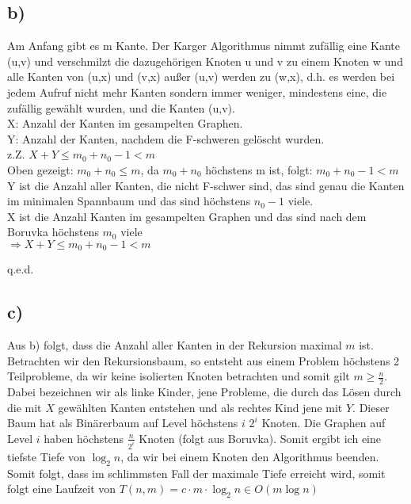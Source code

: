 \documentclass[a4paper,11pt,twoside]{scrartcl}
\newcommand{\qed}{%
	\begin{flushright}
		q.e.d.
	\end{flushright}%
	}
\begin{document}
\subsection*{b)}
Am Anfang gibt es m Kante. Der Karger Algorithmus nimmt zufällig eine Kante (u,v) und verschmilzt die dazugehörigen Knoten u und v zu einem Knoten w und alle Kanten von (u,x) und (v,x) außer (u,v) werden zu (w,x), d.h. es werden bei jedem Aufruf nicht mehr Kanten sondern immer weniger, mindestens eine, die zufällig gewählt wurden, und die Kanten (u,v). \\
X: Anzahl der Kanten im gesampelten Graphen.\\
Y: Anzahl der Kanten, nachdem die F-schweren gelöscht wurden. \\
z.Z. $X+Y \leq m_0+n_0-1 < m$\\
Oben gezeigt: $m_0+n_0 \leq m$, da $m_0+n_0$ höchstens m ist, folgt: $ m_0+n_0 -1<m$  \\
Y ist die Anzahl aller Kanten, die nicht F-schwer sind, das sind genau die Kanten im minimalen Spannbaum und das sind höchstens $n_0-1$ viele.\\ 
X ist die Anzahl Kanten im gesampelten Graphen und das sind nach dem Boruvka höchstens $m_0$ viele\\
$\Rightarrow X+Y \leq m_0 + n_0 -1 <m$  \qed


\subsection*{c)}
Aus b) folgt, dass die Anzahl aller Kanten in der Rekursion maximal $m$ ist. Betrachten wir den Rekursionsbaum, so entsteht aus einem Problem höchstens 2 Teilprobleme, da wir keine isolierten Knoten betrachten und somit gilt $m \geq \frac{n}{2}$. Dabei bezeichnen wir als linke Kinder, jene Probleme, die durch das Lösen durch die mit $X$ gewählten Kanten entstehen und als rechtes Kind jene mit $Y$. Dieser Baum hat als Binärerbaum auf Level höchstens $i$ $2^i$ Knoten. Die Graphen auf Level $i$ haben höchstens $\frac{n}{2^i}$ Knoten (folgt aus Boruvka). Somit ergibt ich eine tiefste Tiefe von $\log_2 n$, da wir bei einem Knoten den Algorithmus beenden.\\
Somit folgt, dass im schlimmsten Fall der maximale Tiefe erreicht wird, somit folgt eine Laufzeit von $T(n,m) =  c\cdot m \cdot \log_2 n \in  O \left(m\log n \right)$
\end{document}

